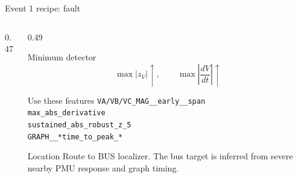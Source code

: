 \documentclass[10pt,aspectratio=169]{beamer}
\newcommand{\code}[1]{\texttt{\footnotesize #1}}
\begin{document}
\begin{frame}{Event 1 recipe: fault}
\small
\begin{columns}[T,totalwidth=\textwidth]
\begin{column}{0.47\textwidth}
\centering
{}
\end{column}
\begin{column}{0.49\textwidth}
\begin{block}{Minimum detector}
\[
\max |z_{V}| \uparrow,\qquad
\max\left|\frac{dV}{dt}\right| \uparrow
\]
\end{block}
\begin{exampleblock}{Use these features}
\code{VA/VB/VC\_MAG\_\_early\_\_span}\\
\code{max\_abs\_derivative}\\
\code{sustained\_abs\_robust\_z\_5}\\
\code{GRAPH\_\_*time\_to\_peak\_*}
\end{exampleblock}
\begin{alertblock}{Location}
Route to BUS localizer. The bus target is inferred from severe nearby PMU response and graph timing.
\end{alertblock}
\end{column}
\end{columns}
\end{frame}
\end{document}
